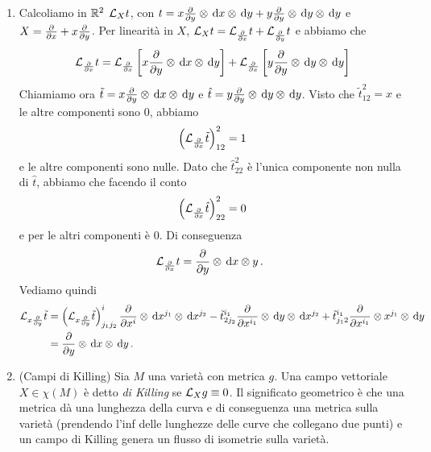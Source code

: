 \begin{example}
	\begin{enumerate}
		\item Calcoliamo in $\mathbb R^2$ $\mathcal L_Xt$, con $t=x\frac{\partial }{\partial y}\otimes \,\mathrm d x \otimes \,\mathrm d y + y\frac{\partial }{\partial y} \otimes \,\mathrm d y \otimes \,\mathrm d y$ e $X = \frac{\partial }{\partial x} + x \frac{\partial }{\partial y}$.
		Per linearità in $X$, $\mathcal L_Xt = \mathcal L_{\frac{\partial }{\partial x}}t + \mathcal L_{\frac{\partial }{\partial y}}t$ e abbiamo che
		\begin{equation*}
			\mathcal L_{\frac{\partial }{\partial x}} t = \mathcal L_{\frac{\partial }{\partial x}} \left[x \frac{\partial }{\partial y}\otimes \,\mathrm d x \otimes \,\mathrm d y\right] + \mathcal L_{\frac{\partial }{\partial x}} \left[y \frac{\partial }{\partial y}\otimes \,\mathrm d y \otimes \,\mathrm d y\right]
		\end{equation*}
		Chiamiamo ora $\tilde t = x\frac{\partial }{\partial y}\otimes \,\mathrm d x \otimes \,\mathrm d y$ e $\hat t = y\frac{\partial }{\partial y} \otimes \,\mathrm d y \otimes \,\mathrm d y$. Visto che $\tilde t_{12}^2 = x$ e le altre componenti sono 0, abbiamo
		\begin{equation*}
			\left(\mathcal L_{\frac{\partial }{\partial x}}\tilde t\right)_{12}^2 = 1
		\end{equation*}
		e le altre componenti sono nulle. 
		Dato che $\hat t_{22}^2$ è l'unica componente non nulla di $\hat t$, abbiamo che facendo il conto
		\begin{equation*}
			\left(\mathcal L_{\frac{\partial }{\partial x}}\hat t\right)_{22}^2 = 0
		\end{equation*}
		e per le altri componenti è 0. Di conseguenza
		\begin{equation*}
			\mathcal L_{\frac{\partial }{\partial x}} t = \frac{\partial }{\partial y} \otimes \,\mathrm d x \otimes y \, \text{. }
		\end{equation*}
		Vediamo quindi
		\begin{align*}
			\mathcal L_{x\frac{\partial }{\partial y}} \tilde t &= \left(\mathcal L_{x\frac{\partial }{\partial y}} \tilde t\right)_{j_1j_2}^i \frac{\partial }{\partial x^i}\otimes\,\mathrm d x^{j_1}\otimes \,\mathrm d x^{j_2} - \tilde t_{2j_2}^{i_1}\frac{\partial }{\partial x^{i_1}} \otimes \,\mathrm d y\otimes \,\mathrm d x^{j_2}
			+ \tilde t_{j_12}^{i_1} \frac{\partial }{\partial x^{i_1}} \otimes x^{j_1}\otimes \,\mathrm d y\\
			&= \frac{\partial }{\partial y}\otimes \,\mathrm d x \otimes \,\mathrm d y \, \text{. }
		\end{align*}

		
		\item (Campi di Killing) Sia $M$ una varietà con metrica $g$. Una campo vettoriale $X\in\chi(M)$ è detto \emph{di Killing} se $\mathcal L_Xg \equiv 0$. Il significato geometrico è che una metrica dà una lunghezza della curva e di conseguenza una metrica sulla varietà (prendendo l'inf delle lunghezze delle curve che collegano due punti) e un campo di Killing genera un flusso di isometrie sulla varietà.
		

\end{enumerate}
\end{example}
